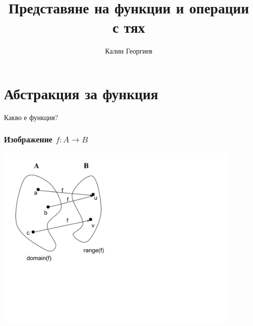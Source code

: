 \documentclass{beamer}
\begin{document}
\title[Обектно ориентирано програмиране]{Представяне на функции и операции с тях} 
\author{Калин Георгиев} 
\frame{\titlepage} 

\section{Абстракция за функция} 

\begin{frame}
\centerline{Какво е функция?}
\end{frame}




\begin{frame}[fragile]
\frametitle{Изображение $f:A\rightarrow B$}

\begin{center}
\includegraphics[width=12.0cm]{images/function_math}
\end{center}


\end{frame}
\end{document}
